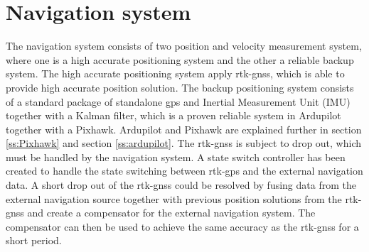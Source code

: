 \section{Navigation system}
The navigation system consists of two position and velocity measurement system, where one is a high accurate positioning system and the other a reliable backup system. The high accurate positioning system apply \gls{rtk-gnss}, which is able to provide high accurate position solution. The backup positioning system consists of a standard package of standalone \gls{gps} and Inertial Measurement Unit (IMU) together with a Kalman filter, which is a proven reliable system in Ardupilot together with a Pixhawk. Ardupilot and Pixhawk are explained further in section \ref{ss:Pixhawk} and section \ref{ss:ardupilot}. The \gls{rtk-gnss} is subject to drop out, which must be handled by the navigation system. A state switch controller has been created to handle the state switching between \gls{rtk-gps} and the external navigation data. A short drop out of the \gls{rtk-gnss} could be resolved by fusing data from the external navigation source together with previous position solutions from the \gls{rtk-gnss} and create a compensator for the external navigation system. The compensator can then be used to achieve the same accuracy as the \gls{rtk-gnss} for a short period.
